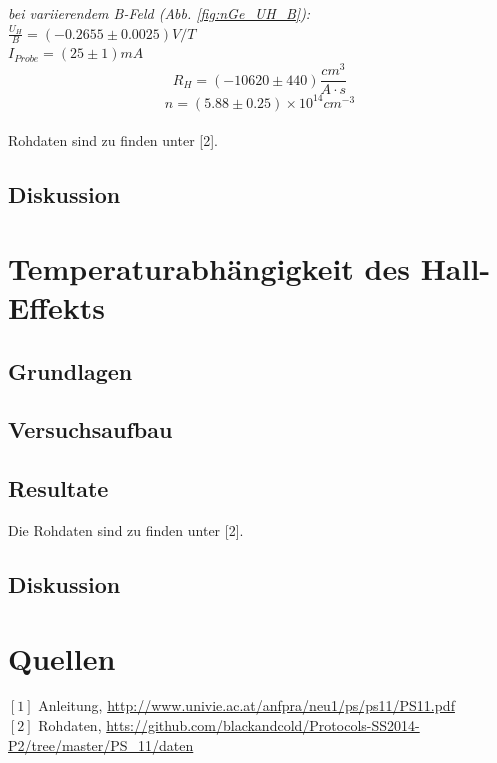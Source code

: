 \documentclass[12pt,a4paper]{article}
\begin{document}
\begin{multicols}{2}

\noindent \emph{bei variierendem B-Feld (Abb. \ref{fig:nGe_UH_B}):}\\

\noindent$\frac{U_H}{B}=(-0.2655 \pm 0.0025)V/T$\\
$I_{Probe}=(25 \pm 1)mA$\\
$$R_H=(-10620 \pm 440)\frac{cm^3}{A\cdot s}$$
$$n=(5.88\pm 0.25)\times 10^{14}cm^{-3}$$\\


Rohdaten sind zu finden unter [2].

\subsection{Diskussion}

\section{Temperaturabhängigkeit des Hall-Effekts}

\subsection{Grundlagen}

\subsection{Versuchsaufbau}

\subsection{Resultate}


 




\noindent Die Rohdaten sind zu finden unter [2].

\subsection{Diskussion}


\section{Quellen}
$[1]$ Anleitung, \url{http://www.univie.ac.at/anfpra/neu1/ps/ps11/PS11.pdf}\\
$[2]$ Rohdaten, \url{htts://github.com/blackandcold/Protocols-SS2014-P2/tree/master/PS_11/daten}\\

\end{multicols}
\end{document}
